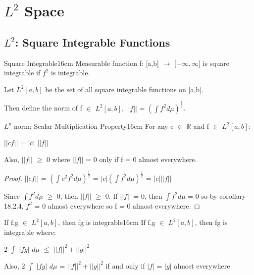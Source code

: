 \newpage

\section[Day 19: $L^2$ Space]{ $L^2$ Space }

\subsection{ $L^2$: Square Integrable Functions }

    \begin{definition}{Square Integrable}{16cm}
        Measurable function f: [a,b] $\rightarrow$ [$-\infty,\infty$]
        is {\color{lblue} square integrable} if $f^2$ is integrable.

        Let $L^2[a,b]$ be the set of all square integrable functions on [a,b].
        
        Then define the norm of f $\in$ $L^2[a,b]$,
        $||f||$ = $(\int f^2 d\mu)^{\frac{1}{2}}$.
    \end{definition}

    \vspace{0.5cm}



    \begin{wtheorem}{$L^p$ norm: Scalar Multiplication Property}{16cm}
        For any c $\in$ $\mathbb{R}$ and f $\in$ $L^2[a,b]$:

        \hspace{0.5cm}
        $||cf||$ = $|c|$ $||f||$

        Also, $||f||$ $\geq$ 0 where $||f||$ = 0 only if f = 0 almost everywhere.
    \end{wtheorem}

    \begin{proof}
        $||cf||$
        = $(\int c^2f^2 d\mu)^{\frac{1}{2}}$
        = $|c| (\int f^2 d\mu)^{\frac{1}{2}}$
        = $|c| ||f||$

        Since $\int f^2 d\mu$ $\geq$ 0, then $||f||$ $\geq$ 0.
        If $||f||$ = 0, then $\int f^2 d\mu$ = 0
        so by {\color{orange} corollary 18.2.4}, $f^2$ = 0 almost
        everywhere so f = 0 almost everywhere.
    \end{proof}

    \vspace{0.5cm}



    \begin{wtheorem}{If f,g $\in$ $L^2[a,b]$, then fg is integrable}{16cm}
        If f,g $\in$ $L^2[a,b]$, then fg is integrable where:

        \hspace{0.5cm}
        2 $\int$ $|fg|$ $d\mu$ $\leq$ $||f||^2 + ||g||^2$

        Also, 2 $\int$ $|fg|$ $d\mu$ = $||f||^2 + ||g||^2$
        if and only if $|f|$ = $|g|$ almost everywhere
    \end{wtheorem}

